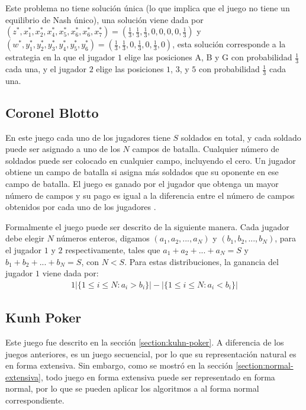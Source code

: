 Este problema no tiene solución única (lo que implica que el juego no tiene un equilibrio de Nash único), una solución viene dada por $(z^*, x^*_1, x^*_2, x^*_4, x^*_5, x^*_6, x^*_6, x^*_7) = (\frac{1}{3}, \frac{1}{3}, \frac{1}{3}, 0, 0, 0, 0, \frac{1}{3})$ y $(w^*, y^*_1, y^*_2, y^*_3,  y^*_4, y^*_5, y^*_6) = (\frac{1}{3}, \frac{1}{3}, 0, \frac{1}{3}, 0, \frac{1}{3}, 0)$, esta solución corresponde a la estrategia en la que el jugador $1$ elige las posiciones A, B y G con probabilidad $\frac{1}{3}$ cada una, y el jugador $2$ elige las posiciones $1$, $3$, y $5$ con probabilidad $\frac{1}{3}$ cada una.

\subsection{Coronel Blotto}
En este juego cada uno de los jugadores tiene $S$ soldados en total, y cada soldado puede ser asignado a uno de los $N$ campos de batalla. Cualquier número de soldados puede ser colocado en cualquier campo, incluyendo el cero. Un jugador obtiene un campo de batalla si asigna más soldados que su oponente en ese campo de batalla. El juego es ganado por el jugador que obtenga un mayor número de campos y su pago es igual a la diferencia entre el número de campos obtenidos por cada uno de los jugadores \cite{bib:introductionCFR}.

Formalmente el juego puede ser descrito de la siguiente manera. Cada jugador debe elegir $N$ números enteros, digamos $(a_1, a_2, ..., a_N)$ y $(b_1, b_2, ..., b_N)$, para el jugador $1$ y $2$ respectivamente, tales que $a_1 + a_2 + ... + a_N = S$ y $b_1 + b_2 + ... + b_N = S$, con $N < S$. Para estas distribuciones, la ganancia del jugador $1$ viene dada por:
\begin{alignat}{1}
|\{ 1 \leq i \leq N : a_i > b_i\}| - |\{ 1 \leq i \leq N : a_i < b_i\}|
\end{alignat}

\subsection{Kunh Poker}
Este juego fue descrito en la sección \ref{section:kuhn-poker}. A diferencia de los juegos anteriores, es un juego secuencial, por lo que su representación natural es en forma extensiva. Sin embargo, como se mostró en la sección \ref{section:normal-extensiva}, todo juego en forma extensiva puede ser representado en forma normal, por lo que se pueden aplicar los algoritmos a al forma normal correspondiente.


